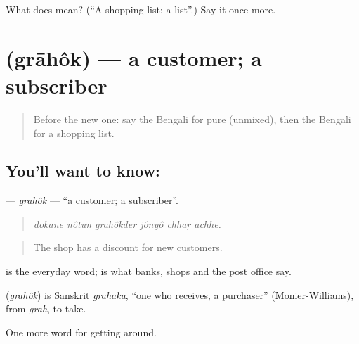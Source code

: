 \begin{tcolorbox}[breakable,colback=teal!4,colframe=teal!35!black,title={Before you move on}]
What does  mean? (\textquotedblleft{}A shopping list; a list\textquotedblright{}.) Say it once more.
\end{tcolorbox}
\section[\texorpdfstring{\bn{গ্রাহক} (grāhôk)}{গ্রাহক (grāhôk)}]{ (grāhôk) — a customer; a subscriber}

\label{lesson:BN-C422-grahok}



\begin{quote}
Before the new one: say the Bengali for pure (unmixed), then the Bengali for a shopping list.
\end{quote}

\subsection*{You'll want to know: }
\textbf{} — \emph{grāhôk} — \textquotedblleft{}a customer; a subscriber\textquotedblright{}.

\begin{quote}
     
\end{quote}

\begin{quote}
\emph{dokāne nôtun grāhôkder jônyô chhāṛ āchhe.}
\end{quote}

\begin{quote}
The shop has a discount for new customers.
\end{quote}

 is the everyday word;  is what banks, shops and the post office say.

\begin{cousinweb}
\textbf{} (\emph{grāhôk}) is Sanskrit \emph{grāhaka}, \textquotedblleft{}one who receives, a purchaser\textquotedblright{} (Monier-Williams), from \emph{grah}, to take.
\end{cousinweb}

\begin{grammarlens}[title={What you've built}]
One more word for getting around.
\end{grammarlens}

